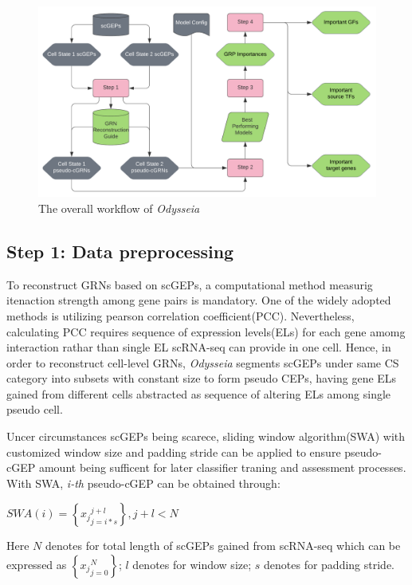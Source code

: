 \documentclass[fleqn,10pt]{wlscirep}
\begin{document}
\begin{figure}[ht]
\centering
\includegraphics[width=0.8\linewidth]{image/Odysseia.png}
\caption{The overall workflow of \emph{Odysseia}}
\label{odysseia}
\end{figure}


\subsection*{Step 1: Data preprocessing}
\label{step1}
To reconstruct GRNs based on scGEPs, a computational method measurig itenaction strength among gene pairs is mandatory.
One of the widely adopted methods is utilizing pearson correlation coefficient(PCC)\cite{cid_2019, pcc_2012}.
Nevertheless, calculating PCC requires sequence of expression levels(ELs) for each gene amomg interaction rathar than single EL scRNA-seq can provide in one cell.
Hence, in order to reconstruct cell-level GRNs, \emph{Odysseia} segments scGEPs under same CS category into subsets with constant size to form pseudo CEPs, having gene ELs gained from different cells abstracted as sequence of altering ELs among single pseudo cell.

Uncer circumstances scGEPs being scarece, sliding window algorithm(SWA) with customized window size and padding stride can be applied to ensure pseudo-cGEP amount being sufficent for later classifier traning and assessment processes. With SWA, \emph{i-th} pseudo-cGEP can be obtained through:

\centerline{$SWA(i) = \left\{{x_j}_{j = i * s}^{j + l}\right\}, j + l < N$}
Here $N$ denotes for total length of scGEPs gained from scRNA-seq which can be expressed as $\left\{{x_j}_{j = 0}^{N}\right\}$; $l$ denotes for window size; $s$ denotes for padding stride.
\end{document}

